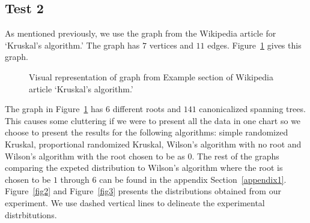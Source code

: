 \documentclass[11pt]{article}
\begin{document}
\subsection{Test 2}\label{test2}

As mentioned previously, we use the graph from the Wikipedia article for `Kruskal's algorithm.' The graph has $7$ vertices and $11$ edges. Figure~\ref{fig:graph2} gives this graph.

\begin{figure}
\centering
{}
\caption{Visual representation of graph from Example section of Wikipedia article `Kruskal's algorithm.'} \label{fig:graph2}
\end{figure}

The graph in Figure~\ref{fig:graph2} has $6$ different roots and $141$ canonicalized spanning trees. This causes some cluttering if we were to present all the data in one chart so we choose to present the results for the following algorithms: simple randomized Kruskal, proportional randomized Kruskal, Wilson's algorithm with no root and Wilson's algorithm with the root chosen to be as $0$. The rest of the graphs comparing the expeted distribution to Wilson's algorithm where the root is chosen to be $1$ through $6$ can be found in the appendix Section~\ref{appendix1}. Figure~\ref{fig2} and Figure~\ref{fig3} presents the distributions obtained from our experiment. We use dashed vertical lines to delineate the experimental distrbitutions.
\end{document}
